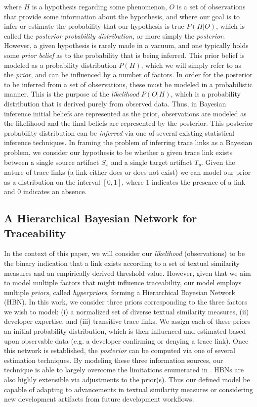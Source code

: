 \noindent where $H$ is a hypothesis regarding some phenomenon, $O$ is a set of observations that provide some information about the hypothesis, and where our goal is to infer or estimate the probability that our hypothesis is true $P(H|O)$, which is called the \textit{posterior probability distribution}, or more simply the \textit{posterior}. However, a given hypothesis is rarely made in a vacuum, and one typically holds some \textit{prior belief} as to the probability that is being inferred.  This prior belief is modeled as a probability distribution $P(H)$, which we will simply refer to as the \textit{prior}, and can be influenced by a number of factors. In order for the posterior to be inferred from a set of observations, these must be modeled in a probabilistic manner. This is the purpose of the \textit{likelihood} $P(O|H)$, which is a probability distribution that is derived purely from observed data. Thus, in Bayesian inference initial beliefs are represented as the prior, observations are modeled as the likelihood and the final beliefs are represented by the posterior. This posterior probability distribution can be \textit{inferred} via one of several existing statistical inference techniques. In framing the problem of inferring trace links as a Bayesian problem, we consider our hypothesis to be whether a given trace link exists between a single source artifact $S_x$ and a single target artifact $T_y$. Given the nature of trace links (\eg a link either does or does not exist) we can model our prior as a distribution on the interval $[0,1]$, where 1 indicates the presence of a link and 0 indicates an absence. 

\subsection{A Hierarchical Bayesian Network for Traceability}

In the context of this paper, we will consider our \textit{likelihood} (observations) to be the binary indication that a link exists according to a set of textual similarity measures and an empirically derived threshold value. However, given that we aim to model multiple factors that might influence traceability, our model employs multiple \textit{priors}, called \textit{hyperpriors}, forming a Hierarchical Bayesian Network (HBN). In this work, we consider three priors corresponding to the three factors we wish to model: (i) a normalized set of diverse textual similarity measures, (ii) developer expertise, and (iii) transitive trace links. We assign each of these priors an initial probability distribution, which is then influenced and estimated based upon observable data (e.g. a developer confirming or denying a trace link). Once this network is established, the \textit{posterior} can be computed via one of several estimation techniques. By modeling these three information sources, our technique is able to largely overcome the limitations enumerated in  . HBNs are also highly extensible via adjustments to the prior(s). Thus our defined model be capable of adapting to advancements in textual similarity measures or considering new development artifacts from future development workflows.
